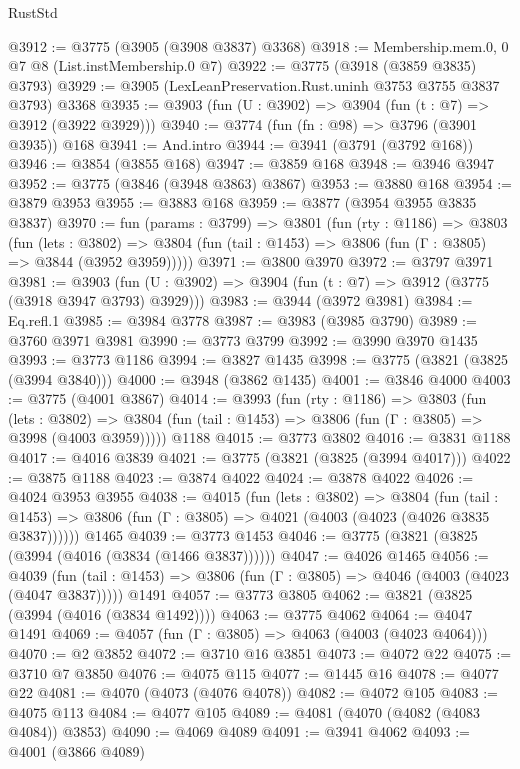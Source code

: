 \begin{lexlean}{RustStd}
\begin{coremodule}
@3912 := @3775 (@3905 (@3908 @3837) @3368)
@3918 := Membership.mem.{0, 0} @7 @8 (List.instMembership.{0} @7)
@3922 := @3775 (@3918 (@3859 @3835) @3793)
@3929 := @3905 (LexLeanPreservation.Rust.uninh @3753 @3755 @3837 @3793) @3368
@3935 := @3903 (fun (U : @3902) => @3904 (fun (t : @7) => @3912 (@3922 @3929)))
@3940 := @3774 (fun (fn : @98) => @3796 (@3901 @3935)) @168
@3941 := And.intro
@3944 := @3941 (@3791 (@3792 @168))
@3946 := @3854 (@3855 @168)
@3947 := @3859 @168
@3948 := @3946 @3947
@3952 := @3775 (@3846 (@3948 @3863) @3867)
@3953 := @3880 @168
@3954 := @3879 @3953
@3955 := @3883 @168
@3959 := @3877 (@3954 @3955 @3835 @3837)
@3970 := fun (params : @3799) =>
  @3801
    (fun (rty : @1186) =>
    @3803
      (fun (lets : @3802) =>
      @3804 (fun (tail : @1453) => @3806 (fun (Γ : @3805) => @3844 (@3952 @3959)))))
@3971 := @3800 @3970
@3972 := @3797 @3971
@3981 := @3903 (fun (U : @3902) => @3904 (fun (t : @7) => @3912 (@3775 (@3918 @3947 @3793) @3929)))
@3983 := @3944 (@3972 @3981)
@3984 := Eq.refl.{1}
@3985 := @3984 @3778
@3987 := @3983 (@3985 @3790)
@3989 := @3760 @3971 @3981
@3990 := @3773 @3799
@3992 := @3990 @3970 @1435
@3993 := @3773 @1186
@3994 := @3827 @1435
@3998 := @3775 (@3821 (@3825 (@3994 @3840)))
@4000 := @3948 (@3862 @1435)
@4001 := @3846 @4000
@4003 := @3775 (@4001 @3867)
@4014 := @3993
    (fun (rty : @1186) =>
    @3803
      (fun (lets : @3802) =>
      @3804 (fun (tail : @1453) => @3806 (fun (Γ : @3805) => @3998 (@4003 @3959)))))
    @1188
@4015 := @3773 @3802
@4016 := @3831 @1188
@4017 := @4016 @3839
@4021 := @3775 (@3821 (@3825 (@3994 @4017)))
@4022 := @3875 @1188
@4023 := @3874 @4022
@4024 := @3878 @4022
@4026 := @4024 @3953 @3955
@4038 := @4015
    (fun (lets : @3802) =>
    @3804
      (fun (tail : @1453) => @3806 (fun (Γ : @3805) => @4021 (@4003 (@4023 (@4026 @3835 @3837))))))
    @1465
@4039 := @3773 @1453
@4046 := @3775 (@3821 (@3825 (@3994 (@4016 (@3834 (@1466 @3837))))))
@4047 := @4026 @1465
@4056 := @4039
    (fun (tail : @1453) => @3806 (fun (Γ : @3805) => @4046 (@4003 (@4023 (@4047 @3837)))))
    @1491
@4057 := @3773 @3805
@4062 := @3821 (@3825 (@3994 (@4016 (@3834 @1492))))
@4063 := @3775 @4062
@4064 := @4047 @1491
@4069 := @4057 (fun (Γ : @3805) => @4063 (@4003 (@4023 @4064)))
@4070 := @2 @3852
@4072 := @3710 @16 @3851
@4073 := @4072 @22
@4075 := @3710 @7 @3850
@4076 := @4075 @115
@4077 := @1445 @16
@4078 := @4077 @22
@4081 := @4070 (@4073 (@4076 @4078))
@4082 := @4072 @105
@4083 := @4075 @113
@4084 := @4077 @105
@4089 := @4081 (@4070 (@4082 (@4083 @4084)) @3853)
@4090 := @4069 @4089
@4091 := @3941 @4062
@4093 := @4001 (@3866 @4089)

\end{coremodule}
\end{lexlean}
